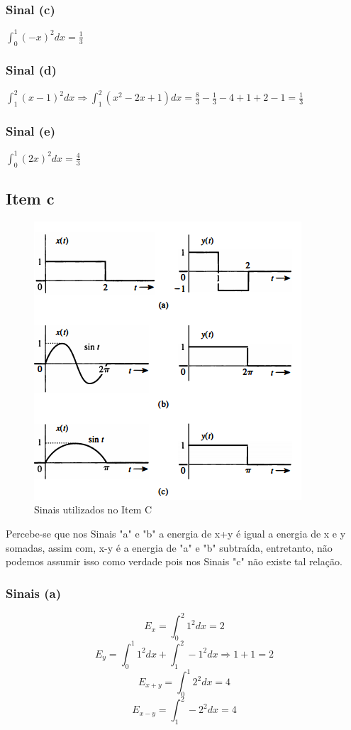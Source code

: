 \documentclass[a4paper, 12pt]{article}
\begin{document}
			\subsubsection{Sinal (c)}
			$\int_{0}^{1} (-x)^{2}dx  = \frac{1}{3}$				
			\subsubsection{Sinal (d)}
			$\int_{1}^{2} (x-1)^{2}dx  \Rightarrow \int_{1}^{2} (x^{2}-2x+1)dx = \frac{8}{3} - \frac{1}{3} - 4 +1 + 2 -1 = \frac{1}{3}$ 		
			\subsubsection{Sinal (e)}
			$\int_{0}^{1} (2x)^{2}dx  = \frac{4}{3}$ 					
		\subsection{Item c}	
			\begin{figure}[!ht]
				\centering
				\includegraphics{img/Figura3.png}
				\caption{Sinais utilizados no Item C}	
			\end{figure}	
			Percebe-se que nos Sinais "a" e "b" a energia de x+y é igual a energia de x e y somadas, assim com, x-y é a energia de "a" e "b" subtraída, entretanto, não podemos assumir isso como verdade pois nos Sinais "c" não existe tal relação.
			\subsubsection{Sinais (a)}
			\[E_{x} = \int_{0}^{2} 1^{2}dx = 2 \]
			\[E_{y} = \int_{0}^{1} 1^{2}dx + \int_{1}^{2} -1^{2}dx \Rightarrow 1 + 1 = 2 \]
			\[E_{x+y} = \int_{0}^{1} 2^{2}dx = 4 \]
			\[E_{x-y} = \int_{1}^{2} -2^{2}dx = 4 \]	
\end{document}
